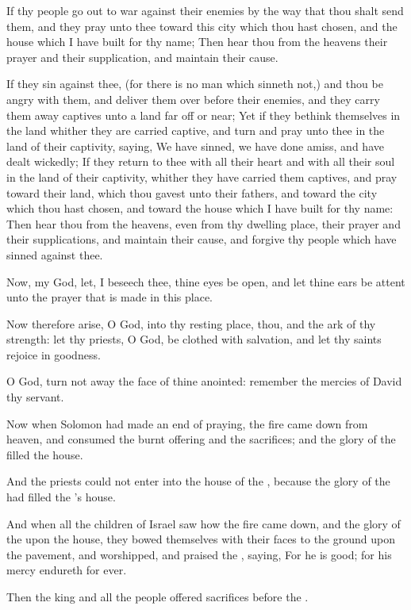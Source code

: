\Verse If thy people go out to war against their enemies by the way that thou shalt send them, and they pray unto thee toward this city which thou hast chosen, and the house which I have built for thy name; \Verse Then hear thou from the heavens their prayer and their supplication, and maintain their cause.

\Verse If they sin against thee, (for there is no man which sinneth not,) and thou be angry with them, and deliver them over before their enemies, and they carry them away captives unto a land far off or near; \Verse Yet if they bethink themselves in the land whither they are carried captive, and turn and pray unto thee in the land of their captivity, saying, We have sinned, we have done amiss, and have dealt wickedly; \Verse If they return to thee with all their heart and with all their soul in the land of their captivity, whither they have carried them captives, and pray toward their land, which thou gavest unto their fathers, and toward the city which thou hast chosen, and toward the house which I have built for thy name: \Verse Then hear thou from the heavens, even from thy dwelling place, their prayer and their supplications, and maintain their cause, and forgive thy people which have sinned against thee.

\Verse Now, my God, let, I beseech thee, thine eyes be open, and let thine ears be attent unto the prayer that is made in this place.

\Verse Now therefore arise, O \LORD God, into thy resting place, thou, and the ark of thy strength: let thy priests, O \LORD God, be clothed with salvation, and let thy saints rejoice in goodness.

\Verse O \LORD God, turn not away the face of thine anointed: remember the mercies of David thy servant.


\Chapter
\Verse Now when Solomon had made an end of praying, the fire came down from heaven, and consumed the burnt offering and the sacrifices; and the glory of the \LORD filled the house.

\Verse And the priests could not enter into the house of the \LORD, because the glory of the \LORD had filled the \LORD's house.

\Verse And when all the children of Israel saw how the fire came down, and the glory of the \LORD upon the house, they bowed themselves with their faces to the ground upon the pavement, and worshipped, and praised the \LORD, saying, For he is good; for his mercy endureth for ever.

\Verse Then the king and all the people offered sacrifices before the \LORD.

